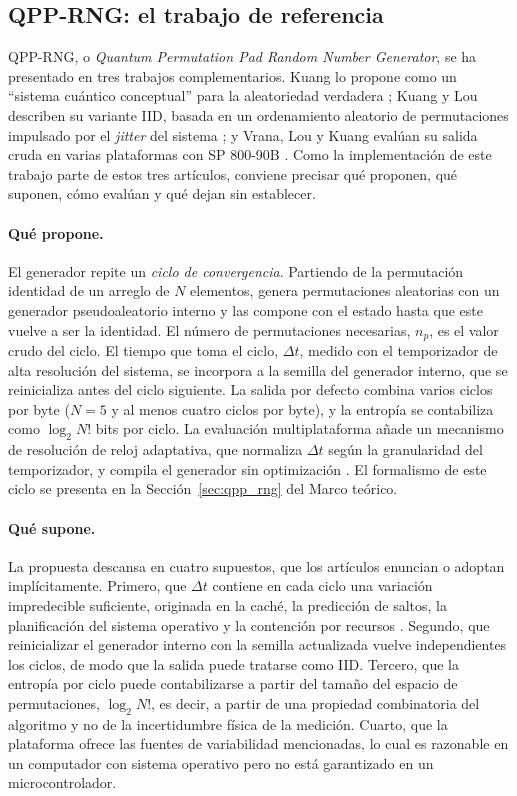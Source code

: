 \subsection{QPP-RNG: el trabajo de referencia}
\label{sec:qpp_rng_referencia}

QPP-RNG, o \textit{Quantum Permutation Pad Random Number Generator}, se ha presentado en tres trabajos complementarios. Kuang lo propone como un ``sistema cuántico conceptual'' para la aleatoriedad verdadera \cite{Kuang2025QPP-RNG:Randomness}; Kuang y Lou describen su variante IID, basada en un ordenamiento aleatorio de permutaciones impulsado por el \textit{jitter} del sistema \cite{Kuang2025IID-BasedJitter}; y Vrana, Lou y Kuang evalúan su salida cruda en varias plataformas con SP 800-90B \cite{Vrana2025RawEvaluation}. Como la implementación de este trabajo parte de estos tres artículos, conviene precisar qué proponen, qué suponen, cómo evalúan y qué dejan sin establecer.

\paragraph{Qué propone.} El generador repite un \emph{ciclo de convergencia}. Partiendo de la permutación identidad de un arreglo de $N$ elementos, genera permutaciones aleatorias con un generador pseudoaleatorio interno y las compone con el estado hasta que este vuelve a ser la identidad. El número de permutaciones necesarias, $n_p$, es el valor crudo del ciclo. El tiempo que toma el ciclo, $\Delta t$, medido con el temporizador de alta resolución del sistema, se incorpora a la semilla del generador interno, que se reinicializa antes del ciclo siguiente. La salida por defecto combina varios ciclos por byte ($N = 5$ y al menos cuatro ciclos por byte), y la entropía se contabiliza como $\log_2 N!$ bits por ciclo. La evaluación multiplataforma añade un mecanismo de resolución de reloj adaptativa, que normaliza $\Delta t$ según la granularidad del temporizador, y compila el generador sin optimización \cite{Vrana2025RawEvaluation}. El formalismo de este ciclo se presenta en la Sección~\ref{sec:qpp_rng} del Marco teórico.

\paragraph{Qué supone.} La propuesta descansa en cuatro supuestos, que los artículos enuncian o adoptan implícitamente. Primero, que $\Delta t$ contiene en cada ciclo una variación impredecible suficiente, originada en la caché, la predicción de saltos, la planificación del sistema operativo y la contención por recursos \cite{Kuang2025IID-BasedJitter}. Segundo, que reinicializar el generador interno con la semilla actualizada vuelve independientes los ciclos, de modo que la salida puede tratarse como IID. Tercero, que la entropía por ciclo puede contabilizarse a partir del tamaño del espacio de permutaciones, $\log_2 N!$, es decir, a partir de una propiedad combinatoria del algoritmo y no de la incertidumbre física de la medición. Cuarto, que la plataforma ofrece las fuentes de variabilidad mencionadas, lo cual es razonable en un computador con sistema operativo pero no está garantizado en un microcontrolador.

